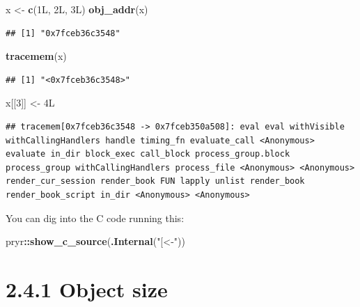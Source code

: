 \documentclass[]{book}
\newenvironment{Shaded}{\begin{snugshade}}{\end{snugshade}}
\newcommand{\DecValTok}[1]{\textcolor[rgb]{0.00,0.00,0.81}{#1}}
\newcommand{\KeywordTok}[1]{\textcolor[rgb]{0.13,0.29,0.53}{\textbf{#1}}}
\newcommand{\NormalTok}[1]{#1}
\newcommand{\OperatorTok}[1]{\textcolor[rgb]{0.81,0.36,0.00}{\textbf{#1}}}
\newcommand{\StringTok}[1]{\textcolor[rgb]{0.31,0.60,0.02}{#1}}
\begin{document}
\begin{Shaded}
\begin{Highlighting}[]
\NormalTok{x <-}\StringTok{ }\KeywordTok{c}\NormalTok{(1L, 2L, 3L)}
\KeywordTok{obj_addr}\NormalTok{(x)}
\end{Highlighting}
\end{Shaded}

\begin{verbatim}
## [1] "0x7fceb36c3548"
\end{verbatim}

\begin{Shaded}
\begin{Highlighting}[]
\KeywordTok{tracemem}\NormalTok{(x)}
\end{Highlighting}
\end{Shaded}

\begin{verbatim}
## [1] "<0x7fceb36c3548>"
\end{verbatim}

\begin{Shaded}
\begin{Highlighting}[]
\NormalTok{x[[}\DecValTok{3}\NormalTok{]] <-}\StringTok{ }\NormalTok{4L}
\end{Highlighting}
\end{Shaded}

\begin{verbatim}
## tracemem[0x7fceb36c3548 -> 0x7fceb350a508]: eval eval withVisible withCallingHandlers handle timing_fn evaluate_call <Anonymous> evaluate in_dir block_exec call_block process_group.block process_group withCallingHandlers process_file <Anonymous> <Anonymous> render_cur_session render_book FUN lapply unlist render_book render_book_script in_dir <Anonymous> <Anonymous>
\end{verbatim}

You can dig into the C code running this:

\begin{Shaded}
\begin{Highlighting}[]
\NormalTok{pryr}\OperatorTok{::}\KeywordTok{show_c_source}\NormalTok{(}\KeywordTok{.Internal}\NormalTok{(}\StringTok{"[<-"}\NormalTok{))}
\end{Highlighting}
\end{Shaded}

\hypertarget{object-size}{%
\section*{2.4.1 Object size}\label{object-size}}
\end{document}
